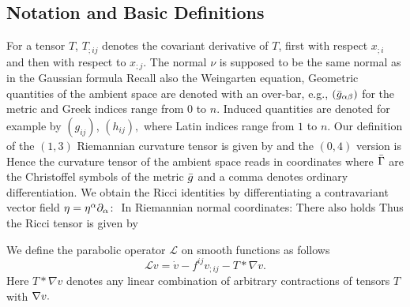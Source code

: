 \subsection{Notation and Basic Definitions}
\label{subsec:bg_notation}
For a tensor $T$, $T_{;ij}$ denotes the covariant derivative of $T$, first with respect $x_{;i}$ and then with respect to $x_{;j}.$ The normal $\nu$ is supposed to be the same normal as in the Gaussian formula
Recall also the Weingarten equation,
Geometric quantities of the ambient space are denoted with an over-bar, e.g., $(\-g_{\a\b})$ for the metric and Greek indices range from $0$ to $n.$ Induced quantities are denoted for example by $(g_{ij})$, $(h_{ij}),$ where Latin indices range from $1$ to $n.$
Our definition of the $(1,3)$ Riemannian curvature tensor is given by
and the $(0,4)$ version is
Hence the curvature tensor of the ambient space reads in coordinates
where $\-\G$ are the Christoffel symbols of the metric $\-g$ and a comma denotes ordinary differentiation.
We obtain the Ricci identities by differentiating a contravariant vector field $\eta=\eta^{\a}\del_{\a}\cn$
In Riemannian normal coordinates:
There also holds
Thus the Ricci tensor is given by

We define the parabolic operator $\mathcal{L}$ on smooth functions as follows
\[\mathcal{L}v=\dot{v}-f^{ij}v_{;ij}-T\ast\nabla v.\]
Here $T\ast \nabla v$ denotes  any linear combination of arbitrary contractions of tensors $T$ with $\n v.$
